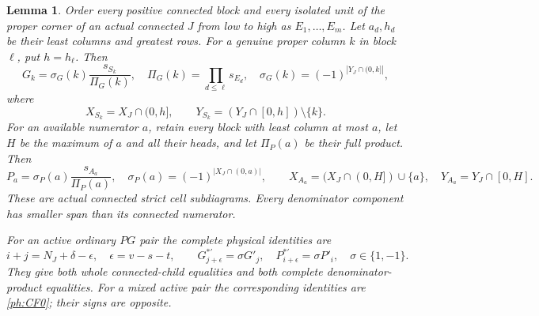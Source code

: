 \documentclass[11pt,a4paper]{amsart}
\numberwithin{equation}{section}
\theoremstyle{plain}
\newtheorem{lemma}[theorem]{Lemma}
\theoremstyle{definition}
\begin{document}
\begin{lemma}\label{ph:coface-data}
Order every positive connected block and every isolated unit of the proper
corner of an actual connected \(J\) from low to high as \(E_1,\ldots,E_m\).
Let \(a_d,h_d\) be their least columns and greatest rows.
For a genuine proper column \(k\) in block \(\ell\), put \(h=h_\ell\).
Then
\[
 G_k=\sigma_G(k)\frac{s_{S_k}}{\Pi_G(k)},\quad
 \Pi_G(k)=\prod_{d\le\ell}s_{E_d},\quad
 \sigma_G(k)=(-1)^{|Y_J\cap(0,k]|},
\]
where
\[
 X_{S_k}=X_J\cap(0,h],\qquad
 Y_{S_k}=(Y_J\cap[0,h])\setminus\{k\}.
\]
For an available numerator \(a\), retain every block with least column
at most \(a\), let \(H\) be the maximum of \(a\) and all their heads,
and let \(\Pi_P(a)\) be their full product.  Then
\[
 P_a=\sigma_P(a)\frac{s_{A_a}}{\Pi_P(a)},\quad
 \sigma_P(a)=(-1)^{|X_J\cap(0,a)|},\qquad
 X_{A_a}=(X_J\cap(0,H])\cup\{a\},\quad
 Y_{A_a}=Y_J\cap[0,H].
\]
These are actual connected strict cell subdiagrams.  Every denominator
component has smaller span than its connected numerator.

For an active ordinary \(PG\) pair the complete physical identities are
\begin{equation}\label{ph:ordinary-pair}
 i+j=N_J+\delta-\epsilon,\quad \epsilon=v-s-t,\qquad
 G^{*'}_{j+\epsilon}=\sigma G'_j,\quad
 P^{*'}_{i+\epsilon}=\sigma P'_i,\quad \sigma\in\{1,-1\}.
\end{equation}
They give both whole connected-child equalities and both complete
denominator-product equalities.  For a mixed active pair the corresponding
identities are \eqref{ph:CF0}; their signs are opposite.
\end{lemma}
\end{document}
